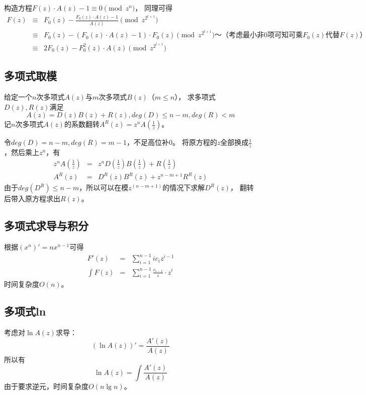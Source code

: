 构造方程$F(z)\cdot A(z)-1\equiv 0\pmod{z^n}$，
同理可得
\begin{eqnarray*}
    F(z)&\equiv& F_0(z)-\frac{F_0(z)\cdot A(z)-1}{A(z)} \pmod{z^{2^{t+1}}}\\
    &\equiv& F_0(z)-(F_0(z)\cdot A(z)-1)\cdot{F_0(z)} \pmod{z^{2^{t+1}}}
    \textrm{～（考虑最小非0项可知可乘$F_0(z)$代替$F(z)$）}\\
    &\equiv& 2F_0(z)-F_0^2(z)\cdot A(z) \pmod{z^{2^{t+1}}}
\end{eqnarray*}
\subsection{多项式取模}
给定一个$n$次多项式$A(z)$与$m$次多项式$B(z)$（$m\leq n$），
求多项式$D(z),R(z)$满足
\begin{displaymath}
    A(z)=D(z)B(z)+R(z),deg(D)\leq n-m,deg(R)<m
\end{displaymath}
记$n$次多项式$A(z)$的系数翻转$A^R(z)=z^nA(\frac{1}{z})$。

令$deg(D)=n-m,deg(R)=m-1$，不足高位补0。
将原方程的$z$全部换成$\frac{1}{z}$，然后乘上$z^n$，有
\begin{eqnarray*}
    z^nA(\frac{1}{z})&=&z^nD(\frac{1}{z})B(\frac{1}{z})+R(\frac{1}{z})\\
    A^R(z)&=&D^R(z)B^R(z)+z^{n-m+1}R^R(z)
\end{eqnarray*}
由于$deg(D^R)\leq n-m$，所以可以在模$z^(n-m+1)$的情况下求解$D^R(z)$，
翻转后带入原方程求出$R(z)$。

\subsection{多项式求导与积分}
根据$(x^n)'=nx^{n-1}$可得
\begin{eqnarray*}
    F'(z)&=&\sum_{i=1}^{n-1}{ic_iz^{i-1}}\\
    \int F(z)&=&\sum_{i=1}^{n-1}{\frac{c_{i-1}}{i}\cdot z^i}
\end{eqnarray*}
时间复杂度$O(n)$。
\subsection{多项式ln}
考虑对$\ln A(z)$求导：
\begin{displaymath}
    (\ln A(z))'=\frac{A'(z)}{A(z)}
\end{displaymath}
所以有
\begin{displaymath}
    \ln A(z)=\int \frac{A'(z)}{A(z)}
\end{displaymath}
由于要求逆元，时间复杂度$O(n \lg n)$。
